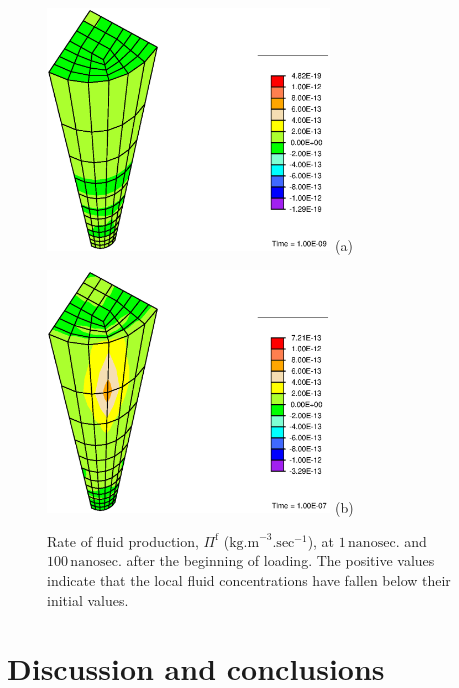 \begin{figure}[ht]
\begin{minipage}[t]{7.5cm}
{\includegraphics[width=7.5cm]{images/Pi-1.eps}} \hskip 3cm (a)
\end{minipage}
\begin{minipage}[t]{7.5cm}
{\includegraphics[width=7.5cm]{images/Pi-100.eps}} \hskip 3cm (b)
\end{minipage}
\caption{Rate of fluid production, $\Pi^\mathrm{f}$
($\mathrm{kg.m}^{-3}.\mathrm{sec}^{-1}$), at $1
\,\mathrm{nanosec.}$ and $100\,\mathrm{nanosec.}$ after the
beginning of loading. The positive values indicate that the local
fluid concentrations have fallen below their initial values.}
\label{Pifig}
\end{figure}

\section{Discussion and conclusions}
\label{sect7}

